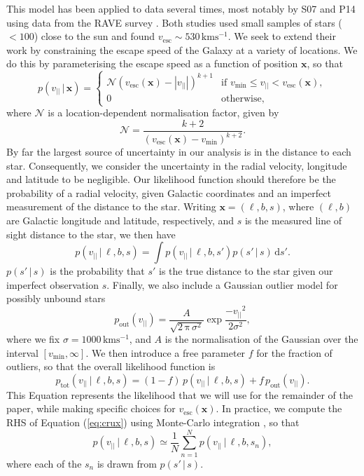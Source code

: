 \documentclass[useAMS,twocolumn,usenatbib]{mn2e}
\def\kms{{\,\mathrm{kms^{-1}}}}
\def\vlos{{v_{||}}}
\def\vesc{{v_\mathrm{esc}}}
\def\vmin{{v_\mathrm{min}}}
\def\pos{{\boldsymbol{x}}}
\def\intd{{\mathrm{d}}}
\begin{document}
This model has been applied to data several times, most notably by S07
and P14 using data from the {\sc RAVE} survey \citep{Ko13}. Both
studies used small samples of stars ($<100$) close to the sun and
found $\vesc \sim 530\kms$. We seek to extend their work by
constraining the escape speed of the Galaxy at a variety of
locations. We do this by parameterising the escape speed as a function
of position $\pos$, so that
%
\begin{equation}
  p(\vlos \,|\, \pos) = \begin{cases}
    \mathcal{N}(\vesc(\pos) - |\vlos|)^{k+1} & \text{if $\vmin \leq \vlos <\vesc(\pos)$},\\
    0 & \text{otherwise},
  \end{cases}
  \label{eq:model}
\end{equation}
%
where $\mathcal{N}$ is a location-dependent normalisation factor,
given by
%
\begin{equation}
\mathcal{N} = \dfrac{k+2}{(\vesc(\pos) - \vmin)^{k+2}}.
\label{eq:norm}
\end{equation}
%
By far the largest source of uncertainty in our analysis is in the
distance to each star. Consequently, we consider the uncertainty in
the radial velocity, longitude and latitude to be negligible. Our
likelihood function should therefore be the probability of a radial
velocity, given Galactic coordinates and an imperfect measurement of
the distance to the star. Writing $\pos = (\ell, b, s)$, where $(\ell,
b)$ are Galactic longitude and latitude, respectively, and $s$ is the
measured line of sight distance to the star, we then have
%
\begin{equation}
p(\vlos \,|\, \ell, b, s) = \int p(\vlos \,| \,\ell, b, s' )p(s'\,|\,s)\, \intd s'.
\label{eq:crux}
\end{equation}
%
$p(s'\,|\,s)$ is the probability that $s'$ is the true distance to the
star given our imperfect observation $s$. Finally, we also include a
Gaussian outlier model for possibly unbound stars
%
\begin{equation}
p_\mathrm{out}(\vlos) = \dfrac{A}{\sqrt{2\,\mathrm{\pi}\,\sigma^2}}\exp \dfrac{-\vlos^2}{2\sigma^2},
\end{equation}
%
where we fix $\sigma = 1000\kms$, and $A$ is the normalisation of the
Gaussian over the interval $\left[v_\mathrm{min},\infty\right]$. We
then introduce a free parameter $f$ for the fraction of outliers, so
that the overall likelihood function is
%
\begin{equation}
p_\mathrm{tot}(\vlos \,|\, \ell, b, s) = (1-f)\,p(\vlos \,|\, \ell, b, s) + f\,p_\mathrm{out}(\vlos).
\end{equation}
%
This Equation represents the likelihood that we will use for the
remainder of the paper, while making specific choices for
$\vesc(\pos)$. In practice, we compute the RHS of Equation
(\ref{eq:crux}) using Monte-Carlo integration
\citep[e.g.][]{Ev16,Bo16}, so that
%
\begin{equation}
p(\vlos \,|\, \ell, b, s) \simeq \dfrac{1}{N}\sum\limits_{n=1}^{N} p(\vlos \,| \,\ell, b, s_n ),
\end{equation}
%
where each of the $s_n$ is drawn from $p(s'\,|\,s)$.
\end{document}
